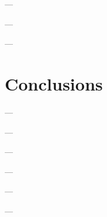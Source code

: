\documentclass[twocolumn]{revtex4}
\begin{document}
---

---

---




\section{Conclusions} \label{s:Conclusions}

---

---

---




\begin{acknowledgments}
    ---
    
    ---
    
    ---
    
\end{acknowledgments}




\end{document}
